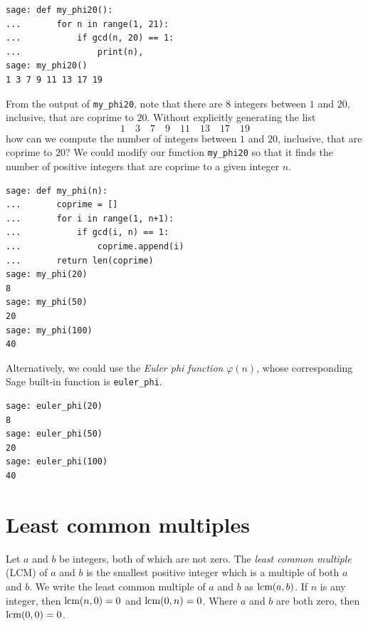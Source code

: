 \begin{lstlisting}
sage: def my_phi20():
...       for n in range(1, 21):
...           if gcd(n, 20) == 1:
...               print(n),
sage: my_phi20()
1 3 7 9 11 13 17 19
\end{lstlisting}
%
From the output of \verb!my_phi20!, note that there are $8$ integers
between $1$ and $20$, inclusive, that are coprime to $20$. Without
explicitly generating the list
%
\begin{equation}
\label{eq:integers_coprime_to_20}
1 \quad 3 \quad 7 \quad 9 \quad 11 \quad 13 \quad 17 \quad 19
\end{equation}
%
how can we compute the number of integers between $1$ and $20$,
inclusive, that are coprime to $20$? We could modify our function
\verb!my_phi20! so that it finds the number of positive integers that
are coprime to a given integer $n$.

\begin{lstlisting}
sage: def my_phi(n):
...       coprime = []
...       for i in range(1, n+1):
...           if gcd(i, n) == 1:
...               coprime.append(i)
...       return len(coprime)
sage: my_phi(20)
8
sage: my_phi(50)
20
sage: my_phi(100)
40
\end{lstlisting}

Alternatively, we could use the
\emph{Euler phi function}
$\varphi(n)$, whose corresponding Sage built-in
function is \verb!euler_phi!.

\begin{lstlisting}
sage: euler_phi(20)
8
sage: euler_phi(50)
20
sage: euler_phi(100)
40
\end{lstlisting}



\section{Least common multiples}

Let $a$ and $b$ be integers, both of which are not zero. The
\emph{least common multiple}
(LCM) of $a$ and $b$ is the smallest positive integer which
is a multiple of both $a$ and $b$. We write the least common multiple
of $a$ and $b$ as $\operatorname*{\text{lcm}}(a, b)$. If $n$ is any integer, then $\operatorname*{\text{lcm}}(n,
0) = 0$ and $\operatorname*{\text{lcm}}(0, n) = 0$. Where $a$ and $b$ are both zero, then
$\operatorname*{\text{lcm}}(0,0) = 0$.

